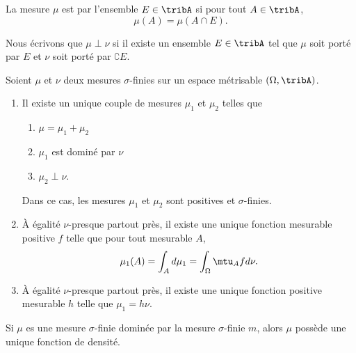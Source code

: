 La mesure \( \mu\) est  par l'ensemble \( E\in\tribA\) si pour tout \( A\in\tribA\), 
\begin{equation}
    \mu(A)=\mu(A\cap E).
\end{equation}

Nous écrivons que \( \mu\perp\nu\) si il existe un ensemble \( E\in\tribA\) tel que \( \mu\) soit porté par \( E\) et \( \nu\) soit porté par \( \complement E\).

\begin{theorem}
    Soient \( \mu\) et \( \nu\) deux mesures \( \sigma\)-finies sur un espace métrisable \( (\Omega,\tribA)\).
    \begin{enumerate}
        \item
            Il existe un unique couple de mesures \( \mu_1\) et \( \mu_2\) telles que
            \begin{enumerate}
                \item
                    \( \mu=\mu_1+\mu_2\)
                \item
                    \( \mu_1\) est dominé par \( \nu\)
                \item
                    \( \mu_2\perp \nu\).
            \end{enumerate}
            Dans ce cas, les mesures \( \mu_1\) et \( \mu_2\) sont positives et \( \sigma\)-finies.
        \item
            À égalité \(  \nu\)-presque partout près, il existe une unique fonction mesurable positive \( f\) telle que pour tout mesurable \( A\),
            \begin{equation}
                \mu_1(A)=\int_Ad\mu_1=\int_{\Omega}\mtu_Afd \nu.
            \end{equation}
        \item
            À égalité \( \nu\)-presque partout près, il existe une unique fonction positive mesurable \( h\) telle que \( \mu_1=h\nu\).
    \end{enumerate}
\end{theorem}

\begin{corollary}   \label{CorZDkhwS}
    Si \( \mu\) es une mesure \( \sigma\)-finie dominée par la mesure \( \sigma\)-finie \( m\), alors \( \mu\) possède une unique fonction de densité.
\end{corollary}

